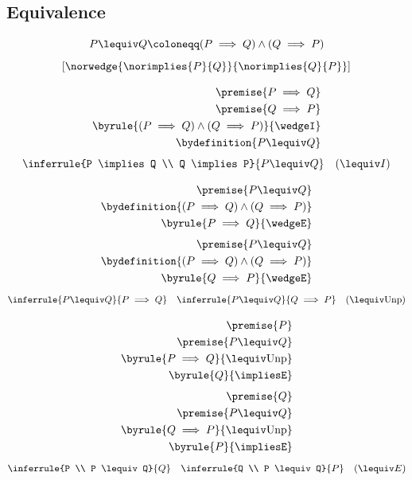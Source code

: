 \subsection{Equivalence}

\newcommand{\norlequiv}[2]{\norwedge{\norimplies{#1}{#2}}{\norimplies{#2}{#1}}}
\begin{notation}
    \[P \lequiv Q \coloneqq (P \implies Q) \wedge (Q \implies P)\]
    \[[\norlequiv{P}{Q}]\]
\end{notation}

\begin{align*}
    \premise{P \implies Q}\\
    \premise{Q \implies P}\\
    \byrule{(P \implies Q) \wedge (Q \implies P)}{\wedgeI}\\
    \bydefinition{P \lequiv Q}
\end{align*}
\newcommand{\lequivI}{{\lequiv}I}
\[\inferrule{P \implies Q \\ Q \implies P}{P \lequiv Q} \quad (\lequivI)\]

\begin{align*}
    \premise{P \lequiv Q}\\
    \bydefinition{(P \implies Q) \wedge (Q \implies P)}\\
    \byrule{P \implies Q}{\wedgeE}
\end{align*}
\begin{align*}
    \premise{P \lequiv Q}\\
    \bydefinition{(P \implies Q) \wedge (Q \implies P)}\\
    \byrule{Q \implies P}{\wedgeE}
\end{align*}
\newcommand{\lequivU}{{\lequiv}\text{Unp}}
\[\inferrule{P \lequiv Q}{P \implies Q} \quad \inferrule{P \lequiv Q}{Q \implies P} \quad (\lequivU)\]

\begin{align*}
    \premise{P}\\
    \premise{P \lequiv Q}\\
    \byrule{P \implies Q}{\lequivU}\\
    \byrule{Q}{\impliesE}\\
\end{align*}
\begin{align*}
    \premise{Q}\\
    \premise{P \lequiv Q}\\
    \byrule{Q \implies P}{\lequivU}\\
    \byrule{P}{\impliesE}\\
\end{align*}
\newcommand{\lequivE}{{\lequiv}E}
\[\inferrule{P \\ P \lequiv Q}{Q} \quad \inferrule{Q \\ P \lequiv Q}{P} \quad (\lequivE)\]

